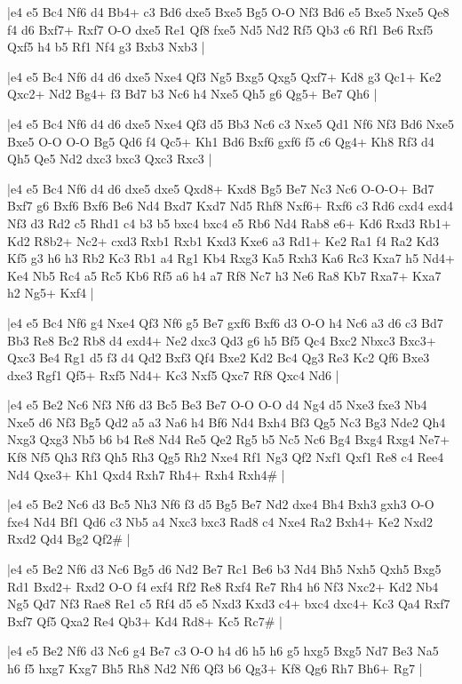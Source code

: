 \whitename{}
\blackname{}
\makegametitle
|e4 e5 Bc4 Nf6 d4 Bb4+ c3 Bd6 dxe5 Bxe5 Bg5 O-O Nf3 Bd6 e5 Bxe5 Nxe5 Qe8 f4 d6 Bxf7+ Rxf7 O-O dxe5 Re1 Qf8 fxe5 Nd5 Nd2 Rf5 Qb3 c6 Rf1 Be6 Rxf5 Qxf5 h4 b5 Rf1 Nf4 g3 Bxb3 Nxb3  |

\whitename{}
\blackname{}
\makegametitle
|e4 e5 Bc4 Nf6 d4 d6 dxe5 Nxe4 Qf3 Ng5 Bxg5 Qxg5 Qxf7+ Kd8 g3 Qc1+ Ke2 Qxc2+ Nd2 Bg4+ f3 Bd7 b3 Nc6 h4 Nxe5 Qh5 g6 Qg5+ Be7 Qh6  |

\whitename{}
\blackname{}
\makegametitle
|e4 e5 Bc4 Nf6 d4 d6 dxe5 Nxe4 Qf3 d5 Bb3 Nc6 c3 Nxe5 Qd1 Nf6 Nf3 Bd6 Nxe5 Bxe5 O-O O-O Bg5 Qd6 f4 Qc5+ Kh1 Bd6 Bxf6 gxf6 f5 c6 Qg4+ Kh8 Rf3 d4 Qh5 Qe5 Nd2 dxc3 bxc3 Qxc3 Rxc3  |

\whitename{}
\blackname{}
\makegametitle
|e4 e5 Bc4 Nf6 d4 d6 dxe5 dxe5 Qxd8+ Kxd8 Bg5 Be7 Nc3 Nc6 O-O-O+ Bd7 Bxf7 g6 Bxf6 Bxf6 Be6 Nd4 Bxd7 Kxd7 Nd5 Rhf8 Nxf6+ Rxf6 c3 Rd6 cxd4 exd4 Nf3 d3 Rd2 c5 Rhd1 c4 b3 b5 bxc4 bxc4 e5 Rb6 Nd4 Rab8 e6+ Kd6 Rxd3 Rb1+ Kd2 R8b2+ Nc2+ cxd3 Rxb1 Rxb1 Kxd3 Kxe6 a3 Rd1+ Ke2 Ra1 f4 Ra2 Kd3 Kf5 g3 h6 h3 Rb2 Kc3 Rb1 a4 Rg1 Kb4 Rxg3 Ka5 Rxh3 Ka6 Rc3 Kxa7 h5 Nd4+ Ke4 Nb5 Rc4 a5 Rc5 Kb6 Rf5 a6 h4 a7 Rf8 Nc7 h3 Ne6 Ra8 Kb7 Rxa7+ Kxa7 h2 Ng5+ Kxf4  |

\whitename{}
\blackname{}
\makegametitle
|e4 e5 Bc4 Nf6 g4 Nxe4 Qf3 Nf6 g5 Be7 gxf6 Bxf6 d3 O-O h4 Nc6 a3 d6 c3 Bd7 Bb3 Re8 Bc2 Rb8 d4 exd4+ Ne2 dxc3 Qd3 g6 h5 Bf5 Qc4 Bxc2 Nbxc3 Bxc3+ Qxc3 Be4 Rg1 d5 f3 d4 Qd2 Bxf3 Qf4 Bxe2 Kd2 Bc4 Qg3 Re3 Kc2 Qf6 Bxe3 dxe3 Rgf1 Qf5+ Rxf5 Nd4+ Kc3 Nxf5 Qxc7 Rf8 Qxc4 Nd6  |

\whitename{}
\blackname{}
\makegametitle
|e4 e5 Be2 Nc6 Nf3 Nf6 d3 Bc5 Be3 Be7 O-O O-O d4 Ng4 d5 Nxe3 fxe3 Nb4 Nxe5 d6 Nf3 Bg5 Qd2 a5 a3 Na6 h4 Bf6 Nd4 Bxh4 Bf3 Qg5 Nc3 Bg3 Nde2 Qh4 Nxg3 Qxg3 Nb5 b6 b4 Re8 Nd4 Re5 Qe2 Rg5 b5 Nc5 Nc6 Bg4 Bxg4 Rxg4 Ne7+ Kf8 Nf5 Qh3 Rf3 Qh5 Rh3 Qg5 Rh2 Nxe4 Rf1 Ng3 Qf2 Nxf1 Qxf1 Re8 c4 Ree4 Nd4 Qxe3+ Kh1 Qxd4 Rxh7 Rh4+ Rxh4 Rxh4\#  |

\whitename{}
\blackname{}
\makegametitle
|e4 e5 Be2 Nc6 d3 Bc5 Nh3 Nf6 f3 d5 Bg5 Be7 Nd2 dxe4 Bh4 Bxh3 gxh3 O-O fxe4 Nd4 Bf1 Qd6 c3 Nb5 a4 Nxc3 bxc3 Rad8 c4 Nxe4 Ra2 Bxh4+ Ke2 Nxd2 Rxd2 Qd4 Bg2 Qf2\#  |

\whitename{}
\blackname{}
\makegametitle
|e4 e5 Be2 Nf6 d3 Nc6 Bg5 d6 Nd2 Be7 Rc1 Be6 b3 Nd4 Bh5 Nxh5 Qxh5 Bxg5 Rd1 Bxd2+ Rxd2 O-O f4 exf4 Rf2 Re8 Rxf4 Re7 Rh4 h6 Nf3 Nxc2+ Kd2 Nb4 Ng5 Qd7 Nf3 Rae8 Re1 c5 Rf4 d5 e5 Nxd3 Kxd3 c4+ bxc4 dxc4+ Kc3 Qa4 Rxf7 Bxf7 Qf5 Qxa2 Re4 Qb3+ Kd4 Rd8+ Kc5 Rc7\#  |

\whitename{}
\blackname{}
\makegametitle
|e4 e5 Be2 Nf6 d3 Nc6 g4 Be7 c3 O-O h4 d6 h5 h6 g5 hxg5 Bxg5 Nd7 Be3 Na5 h6 f5 hxg7 Kxg7 Bh5 Rh8 Nd2 Nf6 Qf3 b6 Qg3+ Kf8 Qg6 Rh7 Bh6+ Rg7  |

